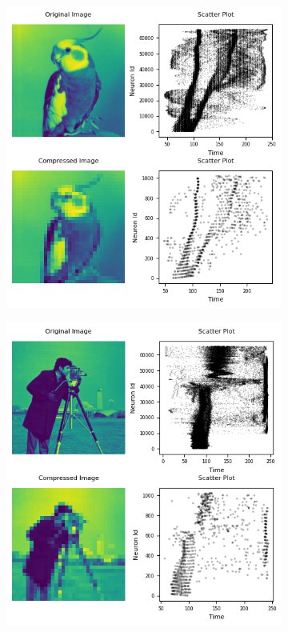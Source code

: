 \documentclass[12pt]{article}
\begin{document}
\begin{figure}[H]
\centering
  \begin{subfigure}[b]{0.45\textwidth}
    \includegraphics[width=\textwidth]{Figs/ttfs_bird.png}
  \end{subfigure}
  \hfill
  \begin{subfigure}[b]{0.45\textwidth}
    \includegraphics[width=\textwidth]{Figs/ttfs_cam.png}

\end{subfigure}
\end{figure}
\end{document}
